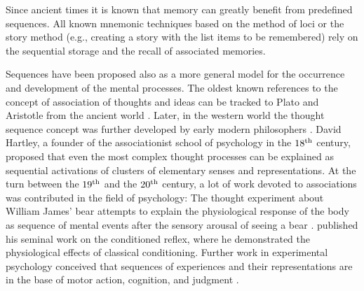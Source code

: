 

  Since ancient times it is known that memory can greatly benefit from
  predefined sequences. All known mnemonic techniques based on the method of
  loci or the story method (e.g., creating a story with the list items to be
  remembered) rely on the sequential storage and the recall of associated
  memories.

  Sequences have been proposed also as a more general model for the occurrence
  and development of the mental processes. The oldest known references to the
  concept of association of thoughts and ideas can be tracked to Plato and
  Aristotle from the ancient world \citep{Plato:Phaedo, Bloch2007}. Later, in
  the western world the thought sequence concept was further developed by early
  modern philosophers \citep{Hobbes, Locke, Hume, Hume2, Stewart}. David
  Hartley, a founder of the associationist school of psychology in the $18^{\rm
  th}$ century, proposed that even the most complex thought processes can be
  explained as sequential activations of clusters of elementary senses and
  representations. At the turn between the $19^{\rm th}$ and the $20^{\rm th}$
  century, a lot of work devoted to associations was contributed in the field
  of psychology: The thought experiment about William James' bear attempts to
  explain the physiological response of the body as sequence of mental events
  after the sensory arousal of seeing a bear \citep{James1884}.
  \cite{Pavlov1897} published his seminal work on the conditioned reflex, where
  he demonstrated the physiological effects of classical conditioning. Further
  work in experimental psychology conceived that sequences of experiences and
  their representations are in the base of motor action, cognition, and
  judgment \citep{Watt1904, Titchener1905, Washburn1916}.


